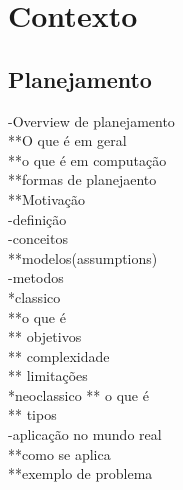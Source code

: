 \chapter{\label{chap:conte}Contexto}


\cite{meneguzzi2015planning}
\cite{ontanon2015adversarial}
\cite{ontanon2012experiments}
\cite{intelligence2003modern}
\cite{buro2003real}
\cite{hogg2010learning} 

\section{Planejamento} 
-Overview de planejamento \cite{ghallab2004automated}\\
**O que é em geral \\
**o que é em computação \\
**formas de planejaento\\
**Motivação \\

-definição \\

-conceitos \cite{ghallab2004automated}\\
**modelos(assumptions) \\

-metodos \\
*classico \\
**o que é \\
** objetivos \\
** complexidade \\
** limitações \\
*neoclassico
** o que é \\
** tipos \\

-aplicação no mundo real\\
**como se aplica \\
**exemplo de problema \\

